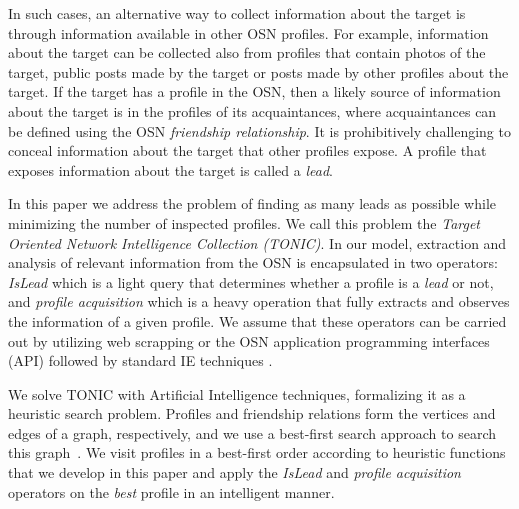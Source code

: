 \documentclass[prodmode,acmtecs]{acmsmall} %
\begin{document}
In such cases, an alternative way to collect information about the target is through information available in other OSN profiles. 
For example, information about the target can be collected also from profiles that contain photos of the target, public posts made by the target or posts made by other profiles about the target.
If the target has a profile in the OSN, then a likely source of information about the target is in the profiles of its acquaintances, where acquaintances can be defined using the OSN {\em friendship relationship}.   
It is prohibitively challenging to conceal information about the target that other profiles expose.
A profile that exposes information about the target is called a {\em lead}.




In this paper we address the problem of finding as many leads as possible while minimizing the number of inspected profiles. We call this problem the {\em Target Oriented Network Intelligence Collection (TONIC)}. 
In our model, extraction and analysis of relevant information from the OSN is encapsulated in two operators: {\em IsLead} which is a light query that determines whether a profile is a {\em lead} or not, and {\em profile acquisition} which is a heavy operation that fully extracts and observes the information of a given profile.
We assume that these operators can be carried out by utilizing web scrapping or the OSN application programming interfaces (API) followed by standard IE techniques \cite{chang2006survey,tang2010aCombinationApproach,pawlas2012universal}.


We solve TONIC with Artificial Intelligence techniques, formalizing it as a heuristic search problem.  Profiles and friendship relations form the vertices and edges of a  graph, respectively, and we use a best-first search approach to search this graph~\cite{vempaty1991depthFirst,russell2010artificialIntelligence}. We visit profiles in a best-first order according to heuristic functions that we develop in this paper and apply the {\em IsLead} and {\em profile acquisition} operators on the {\em best} profile in an intelligent manner. 
\end{document}
